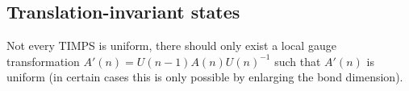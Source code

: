 \subsection{Translation-invariant states}

	\begin{remark}[TIMPS]
		Not every TIMPS is uniform, there should only exist a local gauge transformation $A'(n) = U(n-1)A(n)U(n)^{-1}$ such that $A'(n)$ is uniform (in certain cases this is only possible by enlarging the bond dimension).
	\end{remark}
